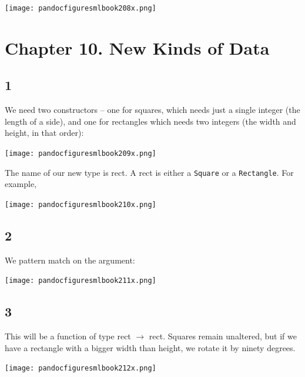 \documentclass[]{book}
\begin{document}
\medskip
\begin{center}
\noindent\texttt{[image: pandocfiguresmlbook208x.png]}
\end{center}
\medskip

\section*{Chapter 10. New Kinds of Data}

\subsection*{1}

We need two constructors -- one for squares, which needs just a single integer (the length of a side), and one for rectangles which needs two integers (the width and height, in that order):

\medskip
\begin{center}
\noindent\texttt{[image: pandocfiguresmlbook209x.png]}
\end{center}
\medskip

\noindent The name of our new type is \textsf{rect}. A rect is either a \texttt{Square} or a \texttt{Rectangle}. For example,

\medskip
\begin{center}
\noindent\texttt{[image: pandocfiguresmlbook210x.png]}
\end{center}
\medskip

\subsection*{2}

\noindent We pattern match on the argument:

\medskip
\begin{center}
\noindent\texttt{[image: pandocfiguresmlbook211x.png]}
\end{center}
\medskip

\subsection*{3}
This will be a function of type \textsf{rect $\rightarrow$ rect}. Squares remain unaltered, but if we have a rectangle with a bigger width than height, we rotate it by ninety degrees.

\medskip
\begin{center}
\noindent\texttt{[image: pandocfiguresmlbook212x.png]}
\end{center}
\medskip
\end{document}
